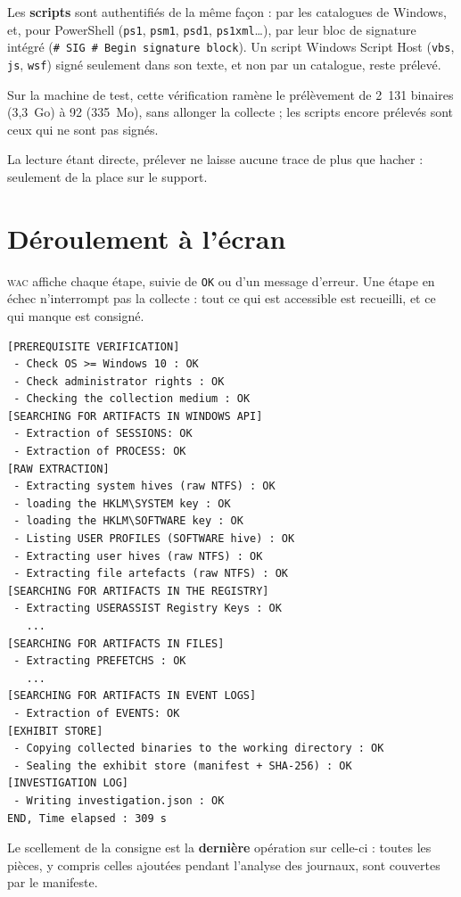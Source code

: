 \documentclass[11pt,a4paper,oneside]{report}
\newcommand{\wac}{\textsc{wac}}
\newcommand{\fichier}[1]{\texttt{#1}}
\begin{document}
Les \textbf{scripts} sont authentifiés de la même façon : par les catalogues de
Windows, et, pour PowerShell (\fichier{ps1}, \fichier{psm1}, \fichier{psd1},
\fichier{ps1xml}\ldots), par leur bloc de signature intégré
(\texttt{\# SIG \# Begin signature block}). Un script Windows Script Host
(\fichier{vbs}, \fichier{js}, \fichier{wsf}) signé seulement dans son texte, et
non par un catalogue, reste prélevé.

Sur la machine de test, cette vérification ramène le prélèvement de 2~131
binaires (3,3~Go) à 92 (335~Mo), sans allonger la collecte ; les scripts encore
prélevés sont ceux qui ne sont pas signés.

La lecture étant directe, prélever ne laisse aucune trace de plus que hacher :
seulement de la place sur le support.

\section{Déroulement à l'écran}

\wac{} affiche chaque étape, suivie de \texttt{OK} ou d'un message d'erreur. Une
étape en échec n'interrompt pas la collecte : tout ce qui est accessible est
recueilli, et ce qui manque est consigné.

\begin{lstlisting}
[PREREQUISITE VERIFICATION]
 - Check OS >= Windows 10 : OK
 - Check administrator rights : OK
 - Checking the collection medium : OK
[SEARCHING FOR ARTIFACTS IN WINDOWS API]
 - Extraction of SESSIONS: OK
 - Extraction of PROCESS: OK
[RAW EXTRACTION]
 - Extracting system hives (raw NTFS) : OK
 - loading the HKLM\SYSTEM key : OK
 - loading the HKLM\SOFTWARE key : OK
 - Listing USER PROFILES (SOFTWARE hive) : OK
 - Extracting user hives (raw NTFS) : OK
 - Extracting file artefacts (raw NTFS) : OK
[SEARCHING FOR ARTIFACTS IN THE REGISTRY]
 - Extracting USERASSIST Registry Keys : OK
   ...
[SEARCHING FOR ARTIFACTS IN FILES]
 - Extracting PREFETCHS : OK
   ...
[SEARCHING FOR ARTIFACTS IN EVENT LOGS]
 - Extraction of EVENTS: OK
[EXHIBIT STORE]
 - Copying collected binaries to the working directory : OK
 - Sealing the exhibit store (manifest + SHA-256) : OK
[INVESTIGATION LOG]
 - Writing investigation.json : OK
END, Time elapsed : 309 s
\end{lstlisting}

Le scellement de la consigne est la \textbf{dernière} opération sur celle-ci :
toutes les pièces, y compris celles ajoutées pendant l'analyse des journaux, sont
couvertes par le manifeste.
\end{document}
